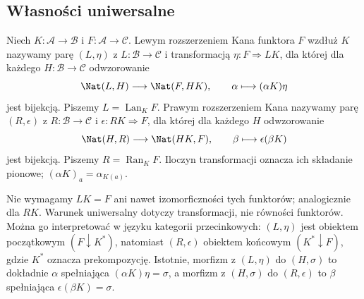\subsection{Własności uniwersalne}
\begin{definicja}\label{cat:def:kan-extension}
Niech $K:\mathcal A\to\mathcal B$ i $F:\mathcal A\to\mathcal C$. Lewym rozszerzeniem Kana funktora $F$ wzdłuż $K$ nazywamy parę $(L,\eta)$ z $L:\mathcal B\to\mathcal C$ i transformacją $\eta:F\Rightarrow LK$, dla której dla każdego $H:\mathcal B\to\mathcal C$ odwzorowanie
\[
 \Nat(L,H)\longrightarrow\Nat(F,HK),\qquad
 \alpha\longmapsto(\alpha K)\eta
\]
jest bijekcją. Piszemy $L=\operatorname{Lan}_K F$.
Prawym rozszerzeniem Kana nazywamy parę $(R,\epsilon)$ z $R:\mathcal B\to\mathcal C$ i $\epsilon:RK\Rightarrow F$, dla której dla każdego $H$ odwzorowanie
\[
 \Nat(H,R)\longrightarrow\Nat(HK,F),\qquad
 \beta\longmapsto\epsilon(\beta K)
\]
jest bijekcją. Piszemy $R=\operatorname{Ran}_K F$. Iloczyn transformacji oznacza ich składanie pionowe; $(\alpha K)_a=\alpha_{K(a)}$.
\end{definicja}
\begin{center}
\end{center}
Nie wymagamy $LK=F$ ani nawet izomorficzności tych funktorów; analogicznie dla $RK$. Warunek uniwersalny dotyczy transformacji, nie równości funktorów. Można go interpretować w języku kategorii przecinkowych: $(L,\eta)$ jest obiektem początkowym $(F\downarrow K^*)$, natomiast $(R,\epsilon)$ obiektem końcowym $(K^*\downarrow F)$, gdzie $K^*$ oznacza prekompozycję. Istotnie, morfizm z $(L,\eta)$ do $(H,\sigma)$ to dokładnie $\alpha$ spełniająca $(\alpha K)\eta=\sigma$, a morfizm z $(H,\sigma)$ do $(R,\epsilon)$ to $\beta$ spełniająca $\epsilon(\beta K)=\sigma$.

